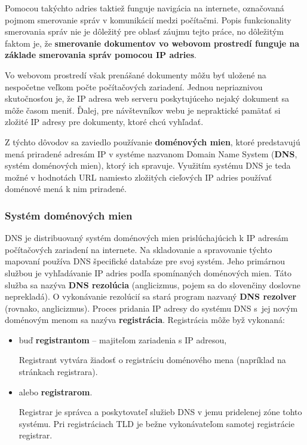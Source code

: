 Pomocou takýchto adries taktiež funguje navigácia na internete, označovaná pojmom smerovanie správ v komunikácií medzi počítačmi.
Popis funkcionality smerovania správ nie je dôležitý pre oblasť záujmu tejto práce, no dôležitým faktom je, že \textbf{smerovanie dokumentov vo webovom prostredí funguje na základe smerovania správ pomocou IP adries}.

Vo webovom prostredí však prenášané dokumenty môžu byť uložené na nespočetne veľkom počte počítačových zariadení.
Jednou nepriaznivou skutočnosťou je, že IP adresa web serveru poskytujúceho nejaký dokument sa môže časom meniť.
Ďalej, pre návštevníkov webu je nepraktické pamätať si zložité IP adresy pre dokumenty, ktoré chcú vyhľadať.

Z týchto dôvodov sa zaviedlo používanie \textbf{doménových mien}, ktoré predstavujú mená priradené adresám IP v systéme nazvanom Domain Name System (\textbf{DNS}, systém doménových mien), ktorý ich spravuje.
Využitím systému DNS je teda možné v hodnotách URL namiesto zložitých cieľových IP adries používať doménové mená k nim priradené.  

\subsubsection{Systém doménových mien}

DNS je distribuovaný systém doménových mien prislúchajúcich k IP adresám počítačových zariadení na internete.
Na skladovanie a spravovanie týchto mapovaní používa DNS špecifické databáze pre svoj systém. 
Jeho primárnou službou je vyhľadávanie IP adries podľa spomínaných doménových mien.
Táto služba sa nazýva \textbf{DNS rezolúcia} (anglicizmus, pojem sa do slovenčiny doslovne neprekladá). 
O vykonávanie rezolúcií sa stará program nazvaný \textbf{DNS rezolver} (rovnako, anglicizmus).
Proces pridania IP adresy do systému DNS \mbox{s jej} novým doménovým menom sa nazýva \textbf{registrácia}.
Registrácia môže byž vykonaná:
\begin{itemize}
    \item buď \textbf{registrantom} -- majiteľom zariadenia s IP adresou,

    Registrant vytvára žiadosť o registráciu doménového mena (napríklad na stránkach registrara).

    \item alebo \textbf{registrarom}.

    Registrar je správca a poskytovateľ služieb DNS v jemu pridelenej zóne tohto systému. %
    Pri registráciach TLD je bežne vykonávateľom samotej registrácie registrar. %
\end{itemize}

